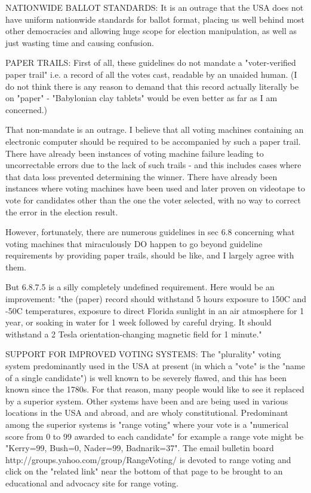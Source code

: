 NATIONWIDE BALLOT STANDARDS:
It is an outrage that the USA does not have uniform nationwide standards for ballot format,
placing us well behind most other democracies and allowing huge scope for election manipulation,
as well as just wasting time and causing confusion.

PAPER TRAILS:
First of all, these guidelines do not mandate a "voter-verified paper trail" i.e. a
record of all the votes cast, readable by an unaided human.  (I do not think there is
any reason to demand that this record actually literally be on "paper" -
"Babylonian clay tablets" would be even better as far as I am
concerned.)

That non-mandate is an outrage.
I believe that all voting machines containing an electronic computer
should be required to be accompanied by such a paper trail.  There have
already been instances of voting machine failure leading to uncorrectable errors due
to the lack of such trails - and this includes cases where that data loss prevented
determining the winner. There have already been instances where voting machines have
been used and later proven on videotape to vote for candidates other than the
one  the voter selected, with no way to correct the error in the election
result.

However, fortunately, there are numerous guidelines in sec 6.8
concerning what voting machines that miraculously DO happen to go beyond guideline
requirements by providing paper trails, should be like, and I largely agree with them.

But 6.8.7.5 is a silly completely undefined requirement.  Here would be
an improvement:
"the (paper) record should withstand 5 hours exposure to 150C and -50C
temperatures, exposure to direct Florida sunlight in an air atmosphere for 1 year, 
or soaking in water for 1 week followed by careful drying.  It should
withstand a 2 Tesla orientation-changing magnetic field for 1 minute."

SUPPORT FOR IMPROVED VOTING SYSTEMS:
The "plurality" voting system predominantly used in the USA at present
(in which a "vote" is the "name of a single candidate") is well known
to be severely flawed, and this has been known since the 1780s.
For that reason, many people would like to see it replaced by a superior
system.  Other systems have been and are being used in various locations in
the USA and abroad, and are wholy constitutional.
Predominant among the superior systems is "range voting" where your
vote is a "numerical score from 0 to 99 awarded to each candidate" for example
a range vote might be "Kerry=99, Bush=0, Nader=99, Badnarik=37".  
The email bulletin board
   http://groups.yahoo.com/group/RangeVoting/
is devoted to range voting and click on the "related link" near the bottom of
that page to be brought to an educational and advocacy site for range voting.

